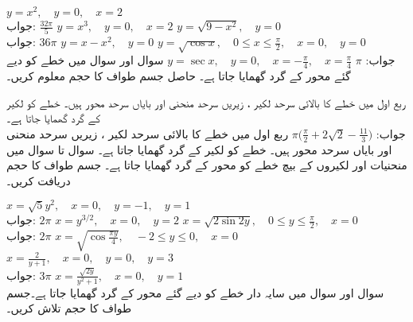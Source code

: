 $y=x^2,\quad y=0,\quad x=2$\\
جواب:\quad
$\tfrac{32\pi}{5}$
$y=x^3,\quad y=0,\quad x=2$
$y=\sqrt{9-x^2},\quad y=0$\\
جواب:\quad
$36\pi$
$y=x-x^2,\quad y=0$
$y=\sqrt{\cos x},\quad 0\le x\le \tfrac{\pi}{2},\quad x=0,\quad y=0$\\
جواب:\quad
$\pi$
$y=\sec x,\quad y=0,\quad x=-\tfrac{\pi}{4},\quad x=\tfrac{\pi}{4}$
سوال  اور سوال  میں خطے کو دیے گئے محور کے گرد گھمایا جاتا ہے۔ حاصل جسم طواف کا حجم معلوم کریں۔

ربع اول میں خطے کا بالائی سرحد لکیر ، زیریں سرحد منحنی  اور بایاں سرحد محور  ہیں۔ خطے کو لکیر  کے گرد گھمایا جاتا ہے۔\\
جواب:\quad
$\pi\big(\tfrac{\pi}{2}+2\sqrt{2}-\tfrac{11}{3}\big)$
ربع اول میں خطے کا بالائی سرحد لکیر ، زیریں سرحد منحنی  اور بایاں سرحد محور  ہیں۔ خطے کو لکیر  کے گرد گھمایا جاتا ہے۔
سوال  تا سوال  میں منحنیات اور لکیروں کے بیچ خطے کو  محور کے گرد گھمایا جاتا ہے۔ جسم طواف کا حجم دریافت کریں۔

$x=\sqrt{5}y^2,\quad x=0,\quad y=-1,\quad y=1$\\
جواب:\quad
$2\pi$
$x=y^{3/2},\quad x=0,\quad y=2$
$x=\sqrt{2\sin 2y},\quad 0\le y\le \tfrac{\pi}{2},\quad x=0$\\
جواب:\quad
$2\pi$
$x=\sqrt{\cos\tfrac{\pi y}{4}},\quad -2\le y\le 0,\quad x=0$
$x=\tfrac{2}{y+1},\quad x=0,\quad y=0,\quad y=3$\\
جواب:\quad
$3\pi$
$x=\tfrac{\sqrt{2y}}{y^2+1},\quad x=0,\quad y=1$
\\
سوال  اور سوال  میں سایہ دار خطے کو دیے گئے محور کے گرد گھمایا جاتا ہے۔جسم طواف کا حجم تلاش کریں۔

